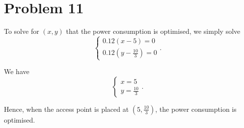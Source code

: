 \documentclass[12pt,a4paper]{article}
\begin{document}
\section*{Problem 11}
\begin{solution}
    To solve for $(x, y)$ that the power consumption is optimised, we simply solve
    \[
    \begin{cases}
        0.12(x-5) = 0\\
        0.12(y-\frac{10}{3}) = 0
    \end{cases}.
    \]

    We have
    \[
    \begin{cases}
        x=5\\
        y=\frac{10}{3}
    \end{cases}.
    \]

    Hence, when the access point is placed at $(5, \frac{10}{3})$, the power consumption is optimised.
    
\end{solution}

\printbibliography
\end{document}
